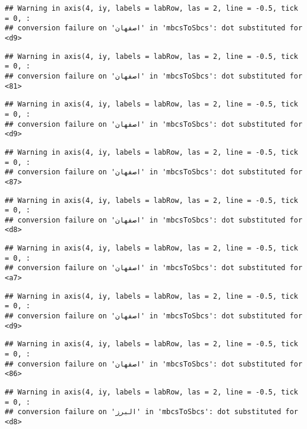 \documentclass[
]{article}
\begin{document}
\begin{verbatim}
## Warning in axis(4, iy, labels = labRow, las = 2, line = -0.5, tick = 0, :
## conversion failure on 'اصفهان' in 'mbcsToSbcs': dot substituted for <d9>
\end{verbatim}

\begin{verbatim}
## Warning in axis(4, iy, labels = labRow, las = 2, line = -0.5, tick = 0, :
## conversion failure on 'اصفهان' in 'mbcsToSbcs': dot substituted for <81>
\end{verbatim}

\begin{verbatim}
## Warning in axis(4, iy, labels = labRow, las = 2, line = -0.5, tick = 0, :
## conversion failure on 'اصفهان' in 'mbcsToSbcs': dot substituted for <d9>
\end{verbatim}

\begin{verbatim}
## Warning in axis(4, iy, labels = labRow, las = 2, line = -0.5, tick = 0, :
## conversion failure on 'اصفهان' in 'mbcsToSbcs': dot substituted for <87>
\end{verbatim}

\begin{verbatim}
## Warning in axis(4, iy, labels = labRow, las = 2, line = -0.5, tick = 0, :
## conversion failure on 'اصفهان' in 'mbcsToSbcs': dot substituted for <d8>
\end{verbatim}

\begin{verbatim}
## Warning in axis(4, iy, labels = labRow, las = 2, line = -0.5, tick = 0, :
## conversion failure on 'اصفهان' in 'mbcsToSbcs': dot substituted for <a7>
\end{verbatim}

\begin{verbatim}
## Warning in axis(4, iy, labels = labRow, las = 2, line = -0.5, tick = 0, :
## conversion failure on 'اصفهان' in 'mbcsToSbcs': dot substituted for <d9>
\end{verbatim}

\begin{verbatim}
## Warning in axis(4, iy, labels = labRow, las = 2, line = -0.5, tick = 0, :
## conversion failure on 'اصفهان' in 'mbcsToSbcs': dot substituted for <86>
\end{verbatim}

\begin{verbatim}
## Warning in axis(4, iy, labels = labRow, las = 2, line = -0.5, tick = 0, :
## conversion failure on 'البرز' in 'mbcsToSbcs': dot substituted for <d8>
\end{verbatim}
\end{document}
